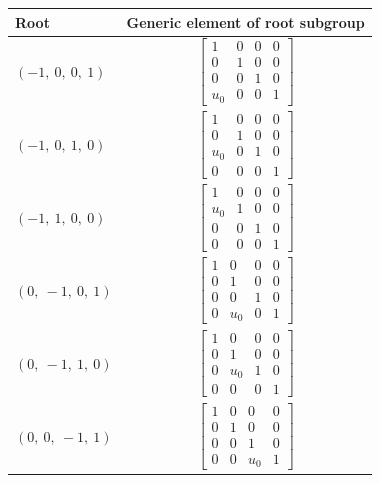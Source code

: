 \documentclass[11pt]{article}
\theoremstyle{definition}
\begin{document}
\noindent \begin{longtable}{|l|c|}
    \hline
    \textbf{Root} & \textbf{Generic element of root subgroup} \\
    \hline
    \endhead
    $\left( -1, \  0, \  0, \  1\right)$ & ${\left[\begin{matrix}1 & 0 & 0 & 0\\0 & 1 & 0 & 0\\0 & 0 & 1 & 0\\u_{0} & 0 & 0 & 1\end{matrix}\right]}$ \\
    \hline
    $\left( -1, \  0, \  1, \  0\right)$ & ${\left[\begin{matrix}1 & 0 & 0 & 0\\0 & 1 & 0 & 0\\u_{0} & 0 & 1 & 0\\0 & 0 & 0 & 1\end{matrix}\right]}$ \\
    \hline
    $\left( -1, \  1, \  0, \  0\right)$ & ${\left[\begin{matrix}1 & 0 & 0 & 0\\u_{0} & 1 & 0 & 0\\0 & 0 & 1 & 0\\0 & 0 & 0 & 1\end{matrix}\right]}$ \\
    \hline
    $\left( 0, \  -1, \  0, \  1\right)$ & ${\left[\begin{matrix}1 & 0 & 0 & 0\\0 & 1 & 0 & 0\\0 & 0 & 1 & 0\\0 & u_{0} & 0 & 1\end{matrix}\right]}$ \\
    \hline
    $\left( 0, \  -1, \  1, \  0\right)$ & ${\left[\begin{matrix}1 & 0 & 0 & 0\\0 & 1 & 0 & 0\\0 & u_{0} & 1 & 0\\0 & 0 & 0 & 1\end{matrix}\right]}$ \\
    \hline
    $\left( 0, \  0, \  -1, \  1\right)$ & ${\left[\begin{matrix}1 & 0 & 0 & 0\\0 & 1 & 0 & 0\\0 & 0 & 1 & 0\\0 & 0 & u_{0} & 1\end{matrix}\right]}$ \\

\end{longtable}
\end{document}

